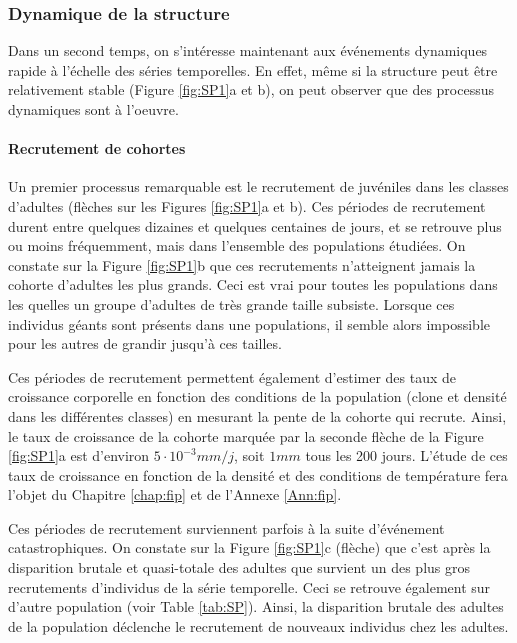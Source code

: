 \subsubsection{Dynamique de la structure}

Dans un second temps, on s'intéresse maintenant aux événements dynamiques rapide
à l'échelle des séries temporelles. En effet, même si la structure peut être
relativement stable (Figure \ref{fig:SP1}a et b), on peut observer que des
processus dynamiques sont à l'oeuvre.
 
\paragraph{Recrutement de cohortes}

Un premier processus remarquable est le recrutement de juvéniles dans les
classes d'adultes (flèches sur les Figures \ref{fig:SP1}a et b). Ces périodes de
recrutement  durent entre quelques dizaines et quelques centaines de jours, et
se retrouve plus ou moins fréquemment, mais dans l'ensemble des populations
étudiées. On constate sur la Figure \ref{fig:SP1}b que ces recrutements
n'atteignent jamais la cohorte d'adultes les plus grands.
Ceci est vrai pour toutes les populations dans les quelles un groupe d'adultes
de très grande taille subsiste. Lorsque ces individus géants sont présents dans
une populations, il semble alors impossible pour les autres de grandir jusqu'à
ces tailles.

Ces périodes de recrutement permettent également d'estimer des taux de
croissance corporelle en fonction des conditions de la population (clone et
densité dans les différentes classes) en mesurant la pente de la cohorte qui
recrute. Ainsi, le taux de croissance de la cohorte marquée par la seconde
flèche de la Figure \ref{fig:SP1}a est d'environ $5\cdot 10^{-3}mm/j$, soit
$1mm$ tous les 200 jours. L'étude de ces taux de croissance en fonction de la
densité et des conditions de température fera l'objet du Chapitre \ref{chap:fip}
et de l'Annexe \ref{Ann:fip}.

Ces périodes de recrutement surviennent parfois à la suite d'événement
catastrophiques. On constate sur la Figure \ref{fig:SP1}c (flèche) que c'est
après la disparition brutale et quasi-totale des adultes que survient un des
plus gros recrutements d'individus de la série temporelle. Ceci se retrouve
également sur d'autre population (voir Table \ref{tab:SP}). Ainsi, la
disparition brutale des adultes de la population déclenche le recrutement de
nouveaux individus chez les adultes. 

